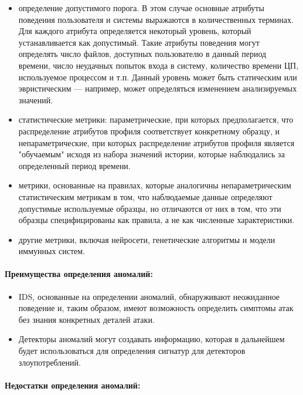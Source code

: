 \begin{itemize}
	\item определение допустимого порога. В этом случае основные атрибуты поведения 
	пользователя и системы выражаются в количественных терминах. Для каждого атрибута 
	определяется некоторый уровень, который устанавливается как допустимый. Такие атрибуты 
	поведения могут определять число файлов, доступных пользователю в данный период времени, 
	число неудачных попыток входа в систему, количество времени ЦП, используемое процессом и 
	т.п. Данный уровень может быть статическим или эвристическим — например, может определяться 
	изменением анализируемых значений.

	\item статистические метрики: параметрические, при которых предполагается, что распределение 
	атрибутов профиля соответствует конкретному образцу, и непараметрические, при которых 
	распределение атрибутов профиля является "обучаемым" исходя из набора значений истории, 
	которые наблюдались за определенный период времени.

	\item метрики, основанные на правилах, которые аналогичны непараметрическим статистическим 
	метрикам в том, что наблюдаемые данные определяют допустимые используемые образцы, но 
	отличаются от них в том, что эти образцы специфицированы как правила, а не как численные 
	характеристики.

	\item другие метрики, включая нейросети, генетические алгоритмы и модели иммунных систем.
\end{itemize}


\paragraph*{Преимущества определения аномалий:}

\begin{itemize}
	\item IDS, основанные на определении аномалий, обнаруживают неожиданное поведение и, 
	таким образом, имеют возможность определить симптомы атак без знания конкретных деталей атаки.

	\item Детекторы аномалий могут создавать информацию, которая в дальнейшем будет 
	использоваться для определения сигнатур для детекторов злоупотреблений.
\end{itemize}


\paragraph*{Недостатки определения аномалий:}

